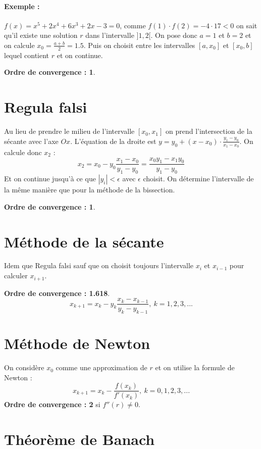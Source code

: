 \documentclass[a4paper,9pt]{extarticle}
\begin{document}
\begin{multicols*}{2}
\paragraph*{Exemple :} $f(x)=x^5+2x^4+6x^3+2x-3=0$, comme $f(1)\cdot f(2) = -4 \cdot 17 < 0$ on sait qu'il existe une solution $r$ dans l'intervalle $]1,2[$. On pose donc $a=1$ et $b=2$ et on calcule $x_0=\frac{a+b}{2}=1.5$. Puis on choisit entre les intervalles $[a,x_0]$ et $[x_0,b]$ lequel contient $r$ et on continue.

\textbf{Ordre de convergence : 1}.

\section{Regula falsi}

Au lieu de prendre le milieu de l'intervalle $[x_0,x_1]$ on prend l'intersection de la sécante avec l'axe $Ox$. L'équation de la droite est $y=y_0+(x-x_0)\cdot\frac{y_1-y_0}{x_1-x_0}$. On calcule donc $x_2$ :
$$
x_2=x_0-y_0\frac{x_1-x_0}{y_1-y_0}=\frac{x_0y_1-x_1y_0}{y_1-y_0}
$$
Et on continue jusqu'à ce que $|y_i| < \epsilon$ avec $\epsilon$ choisit. On détermine l'intervalle de la même manière que pour la méthode de la bissection.

\textbf{Ordre de convergence : 1}.

\section{Méthode de la sécante}

Idem que Regula falsi sauf que on choisit toujours l'intervalle $x_i$ et $x_{i-1}$ pour calculer $x_{i+1}$.

\textbf{Ordre de convergence : 1.618}.
$$
x_{k+1}=x_k-y_k\frac{x_k-x_{k-1}}{y_k-y_{k-1}},\ k=1,2,3,...
$$

\section{Méthode de Newton}

On considère $x_0$ comme une approximation de $r$ et on utilise la formule de Newton :
$$
x_{k+1}=x_k-\frac{f(x_k)}{f'(x_k)},\ k=0,1,2,3,...
$$
\textbf{Ordre de convergence : 2} si $f''(r)\neq 0$.

\section{Théorème de Banach}


\end{multicols*}
\end{document}

